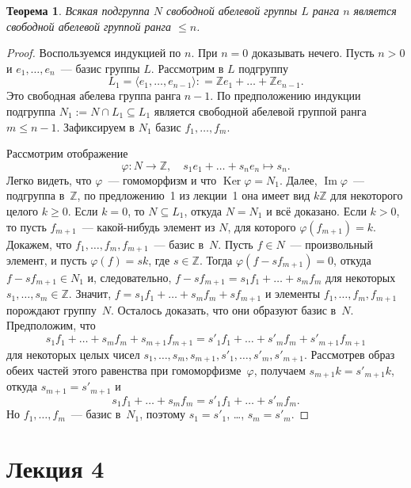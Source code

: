 \documentclass[a4paper,10pt]{amsart}
\newcommand{\Ker}{\mathop{\mathrm{Ker}}}
\renewcommand{\Im}{\mathop{\mathrm{Im}}}
\def\ZZ{{\mathbb Z}}%
\newtheorem{theorem}{Теорема}
\theoremstyle{definition}
\theoremstyle{remark}
\begin{document}
\begin{theorem}
Всякая подгруппа $N$ свободной абелевой группы $L$ ранга $n$
является свободной абелевой группой ранга $\leqslant n$.
\end{theorem}

\begin{proof}
Воспользуемся индукцией по $n$. При $n=0$ доказывать нечего. Пусть
$n>0$ и $e_1,\ldots,e_n$~--- базис группы $L$. Рассмотрим в $L$
подгруппу
$$
L_1 = \langle e_1,\ldots,e_{n-1}\rangle : = \ZZ e_1 + \ldots + \ZZ
e_{n-1}.
$$
Это свободная абелева группа ранга $n-1$. По предположению индукции
подгруппа $N_1:=N\cap L_1 \subseteq L_1$ является свободной абелевой
группой ранга $m \leqslant n-1$. Зафиксируем в $N_1$ базис $f_1,
\ldots, f_m$.

Рассмотрим отображение
$$
\varphi \colon N \to \ZZ, \quad s_1e_1 + \ldots + s_ne_n \mapsto
s_n.
$$
Легко видеть, что $\varphi$~--- гомоморфизм и что $\Ker \varphi =
N_1$. Далее, $\Im \varphi$~--- подгруппа в~$\ZZ$, по предложению~1
из лекции~1 она имеет вид $k \ZZ$ для некоторого целого $k \geqslant
0$. Если $k=0$, то $N \subseteq L_1$, откуда $N = N_1$ и всё
доказано. Если $k>0$, то пусть $f_{m+1}$~--- какой-нибудь элемент из
$N$, для которого $\varphi(f_{m+1}) = k$. Докажем, что $f_1, \ldots,
f_m, f_{m+1}$~--- базис в~$N$. Пусть $f \in N$~--- произвольный
элемент, и пусть $\varphi(f) = sk$, где $s \in \ZZ$. Тогда
$\varphi(f - sf_{m+1}) = 0$, откуда $f - sf_{m+1} \in N_1$ и,
следовательно, $f - sf_{m+1} = s_1 f_1 + \ldots + s_m f_m$ для
некоторых $s_1, \ldots, s_m \in \ZZ$. Значит, $f = s_1 f_1 + \ldots
+ s_m f_m + s f_{m+1}$ и элементы $f_1, \ldots, f_m, f_{m+1}$
порождают группу~$N$. Осталось доказать, что они образуют базис
в~$N$. Предположим, что
$$
s_1 f_1 + \ldots + s_m f_m + s_{m+1} f_{m+1} = s'_1 f_1 + \ldots +
s'_m f_m + s'_{m+1} f_{m+1}
$$
для некоторых целых чисел $s_1, \ldots, s_m, s_{m+1}, s'_1, \ldots,
s'_m, s'_{m+1}$. Рассмотрев образ обеих частей этого равенства при
гомоморфизме~$\varphi$, получаем $s_{m+1} k = s'_{m+1} k$, откуда
$s_{m+1} = s'_{m+1}$ и
$$
s_1 f_1 + \ldots + s_m f_m = s'_1 f_1 + \ldots + s'_m f_m.
$$
Но $f_1, \ldots, f_m$~--- базис в~$N_1$, поэтому $s_1 = s'_1$,
\ldots, $s_m = s'_m$.
\end{proof}



\newpage

\section*{Лекция 4}
\end{document}
